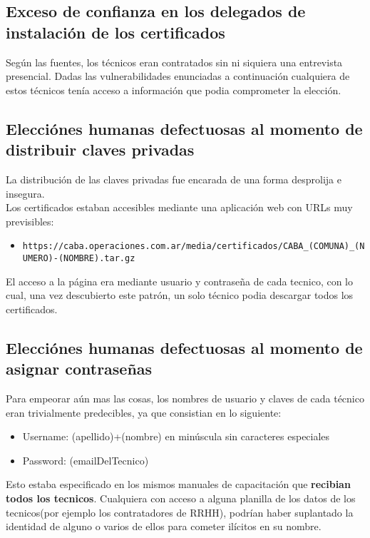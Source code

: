 \subsection{Exceso de confianza en los delegados de instalación de los certificados}

Según las fuentes, los técnicos eran contratados sin ni siquiera una entrevista presencial. Dadas las vulnerabilidades enunciadas a continuación cualquiera de estos técnicos tenía acceso a información que podia comprometer la elección.

\subsection{Elecciónes humanas defectuosas al momento de distribuir claves privadas}

La distribución de las claves privadas fue encarada de una forma desprolija e insegura.\\

Los certificados estaban accesibles mediante una aplicación web con URLs muy previsibles:\\

\begin{itemize}
	\item \texttt{https://caba.operaciones.com.ar/media/certificados/CABA\_(COMUNA)\_(NUMERO)-(NOMBRE).tar.gz}
\end{itemize}

El acceso a la página era mediante usuario y contraseña de cada tecnico, con lo cual, una vez descubierto este patrón, un solo técnico podia descargar todos los certificados.

\subsection{Elecciónes humanas defectuosas al momento de asignar contraseñas}
Para empeorar aún mas las cosas, los nombres de usuario y claves de cada técnico eran trivialmente predecibles, ya que consistian en lo siguiente:

\begin{itemize}
	\item Username: (apellido)+(nombre) en minúscula sin caracteres especiales
	\item Password: (emailDelTecnico)
\end{itemize}

Esto estaba especificado en los mismos manuales de capacitación que \textbf{recibian todos los tecnicos}. Cualquiera con acceso a alguna planilla de los datos de los tecnicos(por ejemplo los contratadores de RRHH), podrían haber suplantado la identidad de alguno o varios de ellos para cometer ilícitos en su nombre.

